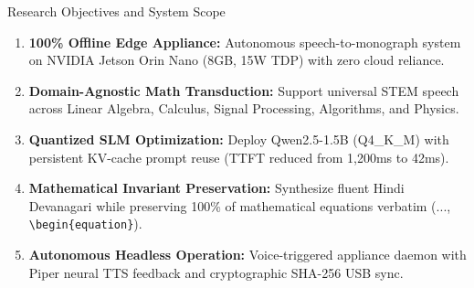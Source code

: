 \documentclass[aspectratio=169,10pt]{beamer}
\begin{document}
\begin{frame}{Research Objectives and System Scope}
  \begin{enumerate}
    \item \textbf{100\% Offline Edge Appliance:} Autonomous speech-to-monograph system on NVIDIA Jetson Orin Nano (8GB, 15W TDP) with zero cloud reliance.
    \item \textbf{Domain-Agnostic Math Transduction:} Support universal STEM speech across Linear Algebra, Calculus, Signal Processing, Algorithms, and Physics.
    \item \textbf{Quantized SLM Optimization:} Deploy Qwen2.5-1.5B (Q4\_K\_M) with persistent KV-cache prompt reuse (TTFT reduced from 1,200ms to 42ms).
    \item \textbf{Mathematical Invariant Preservation:} Synthesize fluent Hindi Devanagari while preserving 100\% of mathematical equations verbatim ($...$, \texttt{\textbackslash begin\{equation\}}).
    \item \textbf{Autonomous Headless Operation:} Voice-triggered appliance daemon with Piper neural TTS feedback and cryptographic SHA-256 USB sync.
  \end{enumerate}
\end{frame}
\end{document}
